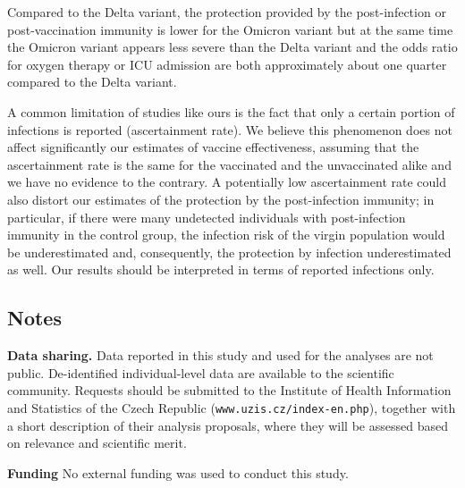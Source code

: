 \documentclass[a4paper,12pt]{article}
\begin{document}
Compared to the Delta variant, the protection provided by the post-infection or post-vaccination immunity is lower for the Omicron variant but at the same time the Omicron variant appears less severe than the Delta variant and the odds ratio for oxygen therapy or ICU admission are both approximately about one quarter compared to the Delta variant.

A common limitation of studies like ours is the fact that only a certain portion of infections is reported (ascertainment rate).  We believe this phenomenon does not affect significantly our estimates of vaccine effectiveness, assuming that the ascertainment rate is the same for the vaccinated and the unvaccinated alike and we have no evidence to the contrary. A potentially low ascertainment rate could also distort our estimates of the protection by the post-infection immunity; in particular, if there were many undetected individuals with post-infection immunity in the control group, the infection risk of the virgin population would be underestimated and, consequently, the protection by infection underestimated as well. Our results should be interpreted in terms of reported infections only. 




\subsection*{Notes}

{\bf Data sharing.} 
Data reported in this study and used for the analyses are not public. De-identified individual-level data are available to the scientific community. Requests should be submitted to the Institute of Health Information and Statistics of the Czech Republic  ({\tt www.uzis.cz/index-en.php}), together with a short description of their analysis proposals, where they will be assessed based on relevance and scientific merit.



{\bf Funding} {\rm No external funding was used to conduct this study.} 
\end{document}
